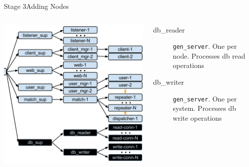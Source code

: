 \documentclass[utf8]{beamer}
\begin{document}
\begin{frame}{Stage 3}{Adding Nodes}
	\begin{columns}
			\begin{center}
				\includegraphics[height=.65\textheight]{img/architecture-4.png}
			\end{center}
			\begin{description}
				\item[db\_reader]
					\texttt{gen\_server}. One per node. Processes db read operations
				\item[db\_writer]
					\texttt{gen\_server}. One per \alert{system}. Processes db write operations
			\end{description}
	\end{columns}
\end{frame}
\end{document}
